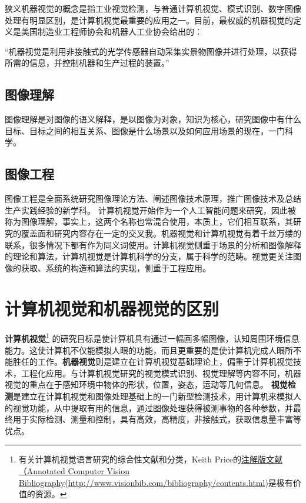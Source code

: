 {狭义机器视觉的概念是指工业视觉检测，与普通计算机视觉、模式识别、数字图像处理有明显区别，是计算机视觉最重要的应用之一。目前，最权威的机器视觉的定义是美国制造业工程师协会和机器人工业协会给出的：
\begin{myqt}
	“机器视觉是利用非接触式的光学传感器自动采集实景物图像并进行处理，以获得所需的信息，并控制机器和生产过程的装置。”
\end{myqt}

\subsection{图像理解}

图像理解是对图像的语义解释，是以图像为对象，知识为核心，研究图像中有什么目标、目标之间的相互关系、图像是什么场景以及如何应用场景的现在，一门科学。

\subsection{图像工程}

图像工程是全面系统研究图像理论方法、阐述图像技术原理，推广图像技术及总结生产实践经验的新学科。
计算机视觉开始作为一个人工智能问题来研究，因此被称为图像理解，事实上，这两个名称也常混合使用，本质上，它们相互联系，其研究的覆盖面和研究内容存在一定的交叉我。机器视觉和计算机视觉有着千丝万缕的联系，很多情况下都有作为同义词使用。计算机视觉侧重于场景的分析和图像解释的理论和算法，计算机视觉是计算机科学的分支，属于科学的范畴。视觉更关注图像的获取、系统的构造和算法的实现，侧重于工程应用。




\section{计算机视觉和机器视觉的区别}
\textbf{计算机视觉}\citep{.2016c}\footnote{有关计算机视觉语言研究的综合性文献和分类，Keith Price的\href{http://www.visionbib.com/bibliography/contents.html}{注解版文献（Annotated Computer Vision Bibliography}(\url{http://www.visionbib.com/bibliography/contents.html})是极有价值的资源。}
的研究目标是使计算机具有通过一幅画多幅图像，认知周围环境信息能力。这使计算机不仅能模拟人眼的功能，而且更重要的是使计算机完成人眼所不能胜任的工作。\textbf{机器视觉}则是建立在计算机视觉基础理论上，偏重于计算机视觉技术，工程化应用。与计算机视觉研究的视觉模式识别、视觉理解等内容不同，机器视觉的重点在于感知环境中物体的形状，位置，姿态，运动等几何信息。
\textbf{视觉检测}是建立在计算机视觉和图像处理基础上的一门新型检测技术，用计算机来模拟人的视觉功能，从中提取有用的信息，通过图像处理获得被测事物的各种参数，并最终用于实际检测、测量\citep{.e}和控制，具有高效，高精度，非接触式，获取信息量丰富等优点。

}
